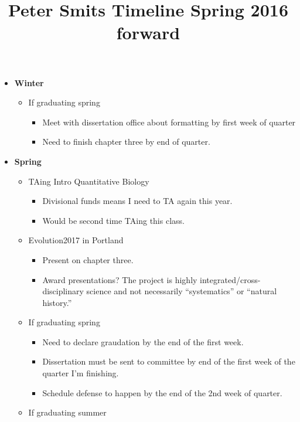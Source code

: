 \documentclass{article}
\title{Peter Smits Timeline Spring 2016 forward}
\date{}
\begin{document}
\linenumbers
\modulolinenumbers[2]

\maketitle
  
\begin{itemize}
  \item \textbf{Winter}
    \begin{itemize}
      \item If graduating spring
        \begin{itemize}
          \item Meet with dissertation office about formatting by first week of quarter
          \item Need to finish chapter three by end of quarter.
        \end{itemize}
    \end{itemize}
  \item \textbf{Spring}
    \begin{itemize}
      \item TAing Intro Quantitative Biology
        \begin{itemize}
          \item Divisional funds means I need to TA again this year.
          \item Would be second time TAing this class.
        \end{itemize}
      \item Evolution2017 in Portland
        \begin{itemize}
          \item Present on chapter three.
          \item Award presentations? The project is highly integrated/cross-disciplinary science and not necessarily ``systematics'' or ``natural history.''
        \end{itemize}
      \item If graduating spring
        \begin{itemize}
          \item Need to declare graudation by the end of the first week.
          \item Dissertation must be sent to committee by end of the first week of the quarter I'm finishing.
          \item Schedule defense to happen by the end of the 2nd week of quarter.
        \end{itemize}
      \item If graduating summer

\end{itemize}
\end{itemize}
\end{document}
